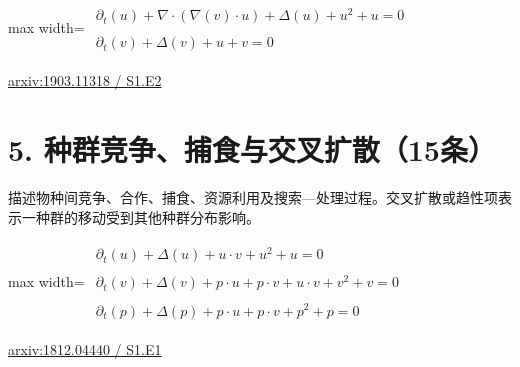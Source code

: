 \documentclass[UTF8,10pt,a4paper,fontset=mac]{ctexart}
\begin{document}
\begin{minipage}{\linewidth}\begin{center}\begin{adjustbox}{max width=\linewidth}$\displaystyle\begin{gathered}\begin{gathered}\partial_{t}(u)+\nabla\cdot(\nabla(v)\cdot u)+\Delta(u)+u^{2}+u=0\end{gathered}\\[5pt]\begin{gathered}\partial_{t}(v)+\Delta(v)+u+v=0\end{gathered}\end{gathered}$\end{adjustbox}\end{center}{\small\href{https://arxiv.org/html/1903.11318#S1.E2}{arxiv:1903.11318 / S1.E2}}\par\end{minipage}\par\vspace{6mm}

\section*{5. 种群竞争、捕食与交叉扩散（15条）}
描述物种间竞争、合作、捕食、资源利用及搜索—处理过程。交叉扩散或趋性项表示一种群的移动受到其他种群分布影响。\par\medskip

\begin{minipage}{\linewidth}\begin{center}\begin{adjustbox}{max width=\linewidth}$\displaystyle\begin{gathered}\begin{gathered}\partial_{t}(u)+\Delta(u)+u\cdot v+u^{2}+u=0\end{gathered}\\[5pt]\begin{gathered}\partial_{t}(v)+\Delta(v)+p\cdot u+p\cdot v+u\cdot v+v^{2}+v=0\end{gathered}\\[5pt]\begin{gathered}\partial_{t}(p)+\Delta(p)+p\cdot u+p\cdot v+p^{2}+p=0\end{gathered}\end{gathered}$\end{adjustbox}\end{center}{\small\href{https://arxiv.org/html/1812.04440#S1.E1}{arxiv:1812.04440 / S1.E1}}\par\end{minipage}\par\vspace{6mm}
\end{document}
